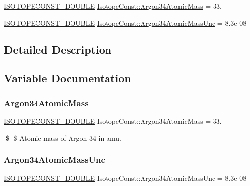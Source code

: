 \begin{DoxyCompactItemize}
\item 
\mbox{\hyperlink{group___isotope_const-_macros_ga8f45a7272ce02c0b4c65c44636ed719a}{I\+S\+O\+T\+O\+P\+E\+C\+O\+N\+S\+T\+\_\+\+D\+O\+U\+B\+LE}} \mbox{\hyperlink{group___isotope_const-_argon-_ar34_ga17b021748f7e8953f9480399fe837bb2}{Isotope\+Const\+::\+Argon34\+Atomic\+Mass}} = 33.
\item 
\mbox{\hyperlink{group___isotope_const-_macros_ga8f45a7272ce02c0b4c65c44636ed719a}{I\+S\+O\+T\+O\+P\+E\+C\+O\+N\+S\+T\+\_\+\+D\+O\+U\+B\+LE}} \mbox{\hyperlink{group___isotope_const-_argon-_ar34_gabdc25ed9d666369949a9c34ab7308495}{Isotope\+Const\+::\+Argon34\+Atomic\+Mass\+Unc}} = 8.\+3e-\/08
\end{DoxyCompactItemize}


\subsection{Detailed Description}


\subsection{Variable Documentation}
\mbox{\label{group___isotope_const-_argon-_ar34_ga17b021748f7e8953f9480399fe837bb2}} 
\subsubsection{\texorpdfstring{Argon34\+Atomic\+Mass}{Argon34AtomicMass}}
{\footnotesize\ttfamily \mbox{\hyperlink{group___isotope_const-_macros_ga8f45a7272ce02c0b4c65c44636ed719a}{I\+S\+O\+T\+O\+P\+E\+C\+O\+N\+S\+T\+\_\+\+D\+O\+U\+B\+LE}} Isotope\+Const\+::\+Argon34\+Atomic\+Mass = 33.}

\$ \$ Atomic mass of Argon-\/34 in amu. \mbox{\label{group___isotope_const-_argon-_ar34_gabdc25ed9d666369949a9c34ab7308495}} 
\subsubsection{\texorpdfstring{Argon34\+Atomic\+Mass\+Unc}{Argon34AtomicMassUnc}}
{\footnotesize\ttfamily \mbox{\hyperlink{group___isotope_const-_macros_ga8f45a7272ce02c0b4c65c44636ed719a}{I\+S\+O\+T\+O\+P\+E\+C\+O\+N\+S\+T\+\_\+\+D\+O\+U\+B\+LE}} Isotope\+Const\+::\+Argon34\+Atomic\+Mass\+Unc = 8.\+3e-\/08}

